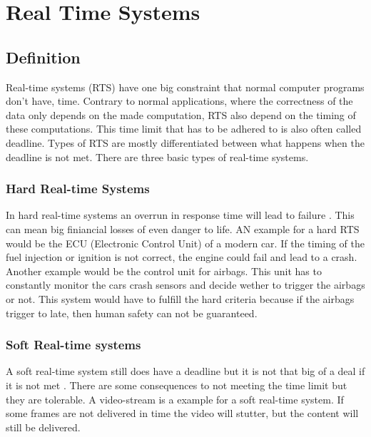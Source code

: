 \chapter{Real Time Systems}
\label{ch:realtimesystems}

\author{Nico Kratky}
%
\section{Definition}

Real-time systems (RTS) have one big constraint that normal computer programs don't have, time. Contrary to normal applications, where the correctness of the data only depends on the made computation, RTS also depend on the timing of these computations. This time limit that has to be adhered to is also often called deadline.
Types of RTS are mostly differentiated between what happens when the deadline is not met. There are three basic types of real-time systems.

\subsection{Hard Real-time Systems}

In hard real-time systems an overrun in response time will lead to failure \autocite{RealTimeHermannKopetz}. This can mean big finiancial losses of even danger to life. AN example for a hard RTS would be the ECU (Electronic Control Unit) of a modern car. If the timing of the fuel injection or ignition is not correct, the engine could fail and lead to a crash. Another example would be the control unit for airbags. This unit has to constantly monitor the cars crash sensors and decide wether to trigger the airbags or not. This system would have to fulfill the hard criteria because if the airbags trigger to late, then human safety can not be guaranteed.

\subsection{Soft Real-time systems}

A soft real-time system still does have a deadline but it is not that big of a deal if it is not met \autocite{RealTimeHermannKopetz}. There are some consequences to not meeting the time limit but they are tolerable. A video-stream is a example for a soft real-time system. If some frames are not delivered in time the video will stutter, but the content will still be delivered.


